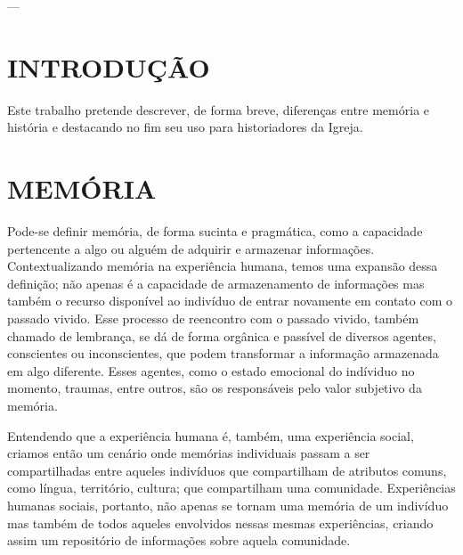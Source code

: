 \documentclass[
    article,            %
	12pt,				%
	oneside,			%
	a4paper,			%
	english,			%
	french,				%
	spanish,			%
	brazil				%
	]{abntex2}
\begin{document}



\imprimircapa

\imprimirfolhaderosto

---
\tableofcontents*
\cleardoublepage

\textual

\section{INTRODUÇÃO}
Este trabalho pretende descrever, de forma breve, diferenças entre memória e história e destacando no fim seu uso para historiadores da Igreja.

\section{MEMÓRIA}
Pode-se definir memória, de forma sucinta e pragmática, como a capacidade pertencente a algo ou alguém de adquirir e armazenar informações. Contextualizando memória na experiência humana, temos uma expansão dessa definição; não apenas é a capacidade de armazenamento de informações mas também o recurso disponível ao indivíduo de entrar novamente em contato com o passado vivido. Esse processo de reencontro com o passado vivido, também chamado de lembrança, se dá de forma orgânica e passível de diversos agentes, conscientes ou inconscientes, que podem transformar a informação armazenada em algo diferente. Esses agentes, como o estado emocional do indíviduo no momento, traumas, entre outros, são os responsáveis pelo valor subjetivo da memória.

Entendendo que a experiência humana é, também, uma experiência social, criamos então um cenário onde memórias individuais passam a ser compartilhadas entre aqueles indivíduos que compartilham de atributos comuns, como língua, território, cultura; que compartilham uma comunidade. Experiências humanas sociais, portanto, não apenas se tornam uma memória de um indivíduo mas também de todos aqueles envolvidos nessas mesmas experiências, criando assim um repositório de informações sobre aquela comunidade.
\end{document}
